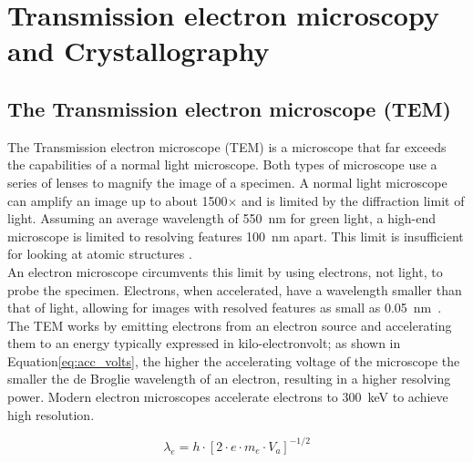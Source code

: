 \chapter{Transmission electron microscopy and Crystallography}
\label{sec:theory}

\section{The Transmission electron microscope (TEM)}
The Transmission electron microscope (TEM) is a microscope that far exceeds the capabilities of a normal light microscope. Both types of microscope use a series of lenses to magnify the image of a specimen.
A normal light microscope can amplify an image up to about 1500$\times$ and is limited by the diffraction limit of light. Assuming an average wavelength of \SI{550}{\nm} for green light, a high-end microscope is limited to resolving features \SI{100}{\nm} apart. This limit is insufficient for looking at atomic structures \cite{PhysRevLett.106.193905}.\\
An electron microscope circumvents this limit by using electrons, not light, to probe the specimen. Electrons, when accelerated, have a wavelength smaller than that of light, allowing for images with resolved features as small as \SI{0.05}{\nm}~\cite{kisielowski_freitag_bischoff_van}. 
The TEM works by emitting electrons from an electron source and accelerating them to an energy typically expressed in kilo-electronvolt; as shown in Equation\ref{eq:acc_volts}, the higher the accelerating voltage of the microscope the smaller the de Broglie wavelength of an electron, resulting in a higher resolving power. Modern electron microscopes accelerate electrons to \SI{300}{\kilo \electronvolt} to achieve high resolution.

\begin{equation}
    \lambda_e = h\cdot \left[ 2 \cdot e \cdot m_e \cdot V_a \right]^{-1/2}
    \label{eq:acc_volts}
\end{equation}



